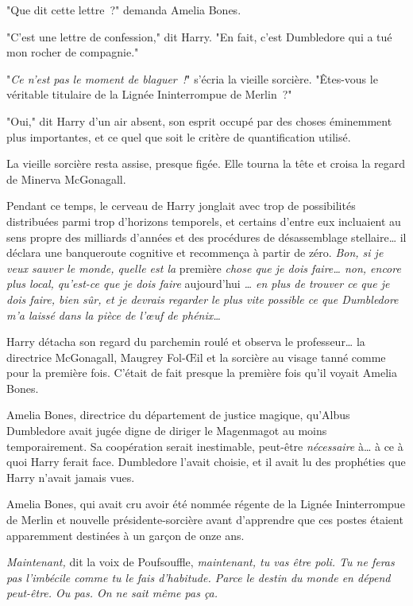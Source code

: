 "Que dit cette lettre~?" demanda Amelia Bones.

"C'est une lettre de confession," dit Harry. "En fait, c'est Dumbledore qui a tué mon rocher de compagnie."

"\emph{Ce n'est pas le moment de blaguer~!}" s'écria la vieille sorcière. "Êtes-vous le véritable titulaire de la Lignée Ininterrompue de Merlin~?"

"Oui," dit Harry d'un air absent, son esprit occupé par des choses éminemment plus importantes, et ce quel que soit le critère de quantification utilisé.

La vieille sorcière resta assise, presque figée. Elle tourna la tête et croisa la regard de Minerva McGonagall.

Pendant ce temps, le cerveau de Harry jonglait avec trop de possibilités distribuées parmi trop d'horizons temporels, et certains d'entre eux incluaient au sens propre des milliards d'années et des procédures de désassemblage stellaire… il déclara une banqueroute cognitive et recommença à partir de zéro. \emph{Bon, si je veux sauver le monde, quelle est la} première \emph{chose que je dois faire… non, encore plus local, qu'est-ce que je dois faire} aujourd'hui \emph{… en plus de trouver ce que je dois faire, bien sûr, et je devrais regarder le plus vite possible ce que Dumbledore m'a laissé dans la pièce de l'œuf de phénix…}

Harry détacha son regard du parchemin roulé et observa le professeur… la directrice McGonagall, Maugrey Fol-Œil et la sorcière au visage tanné comme pour la première fois. C'était de fait presque la première fois qu'il voyait Amelia Bones.

Amelia Bones, directrice du département de justice magique, qu'Albus Dumbledore avait jugée digne de diriger le Magenmagot au moins temporairement. Sa coopération serait inestimable, peut-être \emph{nécessaire} à… à ce à quoi Harry ferait face. Dumbledore l'avait choisie, et il avait lu des prophéties que Harry n'avait jamais vues.

Amelia Bones, qui avait cru avoir été nommée régente de la Lignée Ininterrompue de Merlin et nouvelle présidente-sorcière avant d'apprendre que ces postes étaient apparemment destinées à un garçon de onze ans.

\emph{Maintenant,} dit la voix de Poufsouffle, \emph{maintenant, tu vas être poli. Tu ne feras pas l'imbécile comme tu le fais d'habitude. Parce le destin du monde en dépend peut-être. Ou pas. On ne sait même pas ça.}

